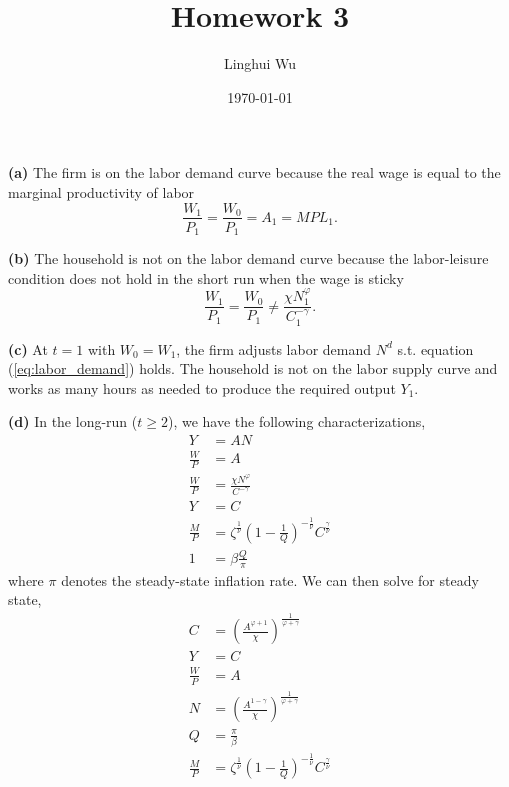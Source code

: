 \documentclass[12pt]{article}
\title{
Homework 3
}
\author{Linghui Wu}
\date{\today}
\begin{document}
\maketitle

\textbf{(a)} The firm is on the labor demand curve because the real wage is equal to the marginal productivity of labor 
\begin{equation}
\label{eq:labor_demand}
\frac{W_{1}}{P_{1}} = \frac{W_{0}}{P_{1}} = A_{1} = MPL_{1}.
\end{equation}

\textbf{(b)} The household is not on the labor demand curve because the labor-leisure condition does not hold in the short run when the wage is sticky
\begin{equation}
\label{eq:labor_supply}
\frac{W_{1}}{P_{1}} = \frac{W_{0}}{P_{1}} \neq \frac{\chi N^{\varphi}_{1}}{C^{-\gamma}_{1}}.
\end{equation}

\textbf{(c)} At $t=1$ with $W_{0}=W_{1}$, the firm adjusts labor demand $N^{d}$ s.t. equation (\ref{eq:labor_demand}) holds. 
The household is not on the labor supply curve and works as many hours as needed to produce the required output $Y_{1}$.

\textbf{(d)} In the long-run ($t \geq 2$), we have the following characterizations,
\begin{align*}
Y &= AN \\
\frac{W}{P} &= A \\
\frac{W}{P} &= \frac{\chi N^{\varphi}}{C^{-\gamma}} \\
Y &= C \\
\frac{M}{P} &= \zeta^{\frac{1}{\nu}}(1-\frac{1}{Q})^{-\frac{1}{\nu}}C^{\frac{\gamma}{\nu}} \\
1 &= \beta \frac{Q}{\pi}
\end{align*}
where $\pi$ denotes the steady-state inflation rate.
We can then solve for steady state,
\begin{align*}
C &= \left(\frac{A^{\varphi+1}}{\chi}\right)^{\frac{1}{\varphi+\gamma}} \\
Y &= C \\
\frac{W}{P} &= A \\
N &= \left(\frac{A^{1-\gamma}}{\chi}\right)^{\frac{1}{\varphi+\gamma}} \\
Q &= \frac{\pi}{\beta} \\
\frac{M}{P} &= \zeta^{\frac{1}{\nu}}(1-\frac{1}{Q})^{-\frac{1}{\nu}}C^{\frac{\gamma}{\nu}}
\end{align*}
\end{document}
